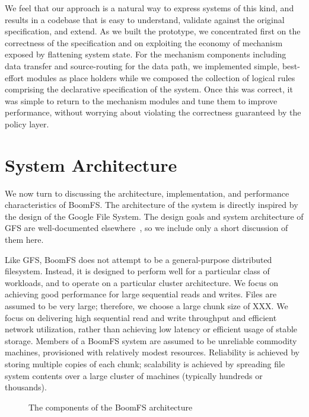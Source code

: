 \documentclass{article}
\begin{document}
We feel that our approach is a natural way to express systems of this kind, and results in a codebase that is easy to understand, validate against the original specification, and extend.  As we built the prototype, we concentrated first on the correctness of the specification and on exploiting the economy of mechanism exposed by flattening system state.  For the mechanism components including data transfer and source-routing for the data path, we implemented simple, best-effort modules as place holders while we composed the collection of logical rules comprising the declarative specification of the system.  Once this was correct, it was simple to return to the mechanism modules and tune them to improve performance, without worrying about violating the correctness guaranteed by the policy layer.

\section{System Architecture}
\label{system-arch}
We now turn to discussing the architecture, implementation, and
performance characteristics of BoomFS. The architecture of the system
is directly inspired by the design of the Google File System. The
design goals and system architecture of GFS are well-documented
elsewhere~\cite{gfs, hdfs-arch}, so we include only a short discussion
of them here.

Like GFS, BoomFS does not attempt to be a general-purpose distributed
filesystem. Instead, it is designed to perform well for a particular
class of workloads, and to operate on a particular cluster
architecture. We focus on achieving good performance for large
sequential reads and writes. Files are assumed to be very large;
therefore, we choose a large chunk size of XXX. We focus on delivering
high sequential read and write throughput and efficient network
utilization, rather than achieving low latency or efficient usage of
stable storage. Members of a BoomFS system are assumed to be
unreliable commodity machines, provisioned with relatively modest
resources.  Reliability is achieved by storing multiple copies of each
chunk; scalability is achieved by spreading file system contents over
a large cluster of machines (typically hundreds or thousands).

\begin{figure}
\centering
{}
\caption{The components of the BoomFS architecture}
\label{fig:system-arch}
\end{figure}
\end{document}
